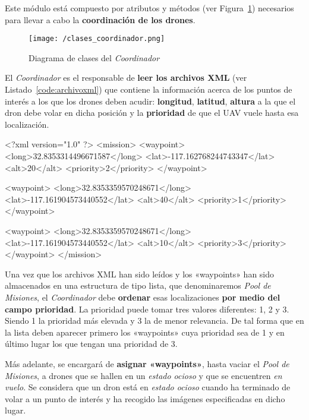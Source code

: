 Este módulo está compuesto por atributos y métodos (ver Figura~\ref{fig:diagclasescoord}) necesarios para llevar a cabo la \textbf{coordinación de los drones}.

\begin{figure}[!h]
\begin{center}
\texttt{[image: /clases\_coordinador.png]}
\caption[Diagrama de clases del \textit{Coordinador}]{Diagrama de clases del \textit{Coordinador}}
\label{fig:diagclasescoord}
\end{center}
\end{figure}

El \textit{Coordinador} es el responsable de \textbf{leer los archivos XML} (ver Listado~\ref{code:archivoxml}) que contiene la información acerca de los puntos de interés a los que los drones deben acudir: \textbf{longitud}, \textbf{latitud}, \textbf{altura} a la que el dron debe volar en dicha posición y la \textbf{prioridad} de que el \acs{UAV} vuele hasta esa localización.

\begin{listing}[
  float=h!,
  language = XML,
  caption  = {Ejemplo de archivo XML que contiene la información de los «waypoints»},
  label    = code:archivoxml]
<?xml version="1.0" ?>
<mission>
	<waypoint>
 		<long>32.8353314496671587</long>
 		<lat>-117.162768244743347</lat>
		<alt>20</alt>
		<priority>2</priority>
	</waypoint>

	<waypoint>
 		<long>32.8353359570248671</long>
 		<lat>-117.161904573440552</lat>
		<alt>40</alt>
		<priority>1</priority>
	</waypoint>

	<waypoint>
 		<long>32.8353359570248671</long>
 		<lat>-117.161904573440552</lat>
		<alt>10</alt>
		<priority>3</priority>
	</waypoint>
</mission>
\end{listing}

Una vez que los archivos XML han sido leídos y los «waypoints» han sido almacenados en una estructura de tipo lista, que denominaremos \textit{Pool de Misiones}, el \textit{Coordinador} debe \textbf{ordenar} esas localizaciones \textbf{por medio del campo prioridad}. La prioridad puede tomar tres valores diferentes: 1, 2 y 3. Siendo 1 la prioridad más elevada y 3 la de menor relevancia. De tal forma que en la lista deben aparecer primero los «waypoints» cuya prioridad sea de 1 y en último lugar los que tengan una prioridad de 3.

Más adelante, se encargará de \textbf{asignar «waypoints»}, hasta vaciar el \textit{Pool de Misiones}, a drones que se hallen en un \textit{estado ocioso} y que se encuentren \textit{en vuelo}. Se considera que un dron está en \textit{estado ocioso} cuando ha terminado de volar a un punto de interés y ha recogido las imágenes especificadas en dicho lugar. 

